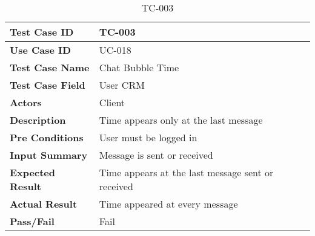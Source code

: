 
\begin{table}[H]
    \centering
    \caption{TC-003}
    \begin{tabular}{ |p{3.8cm}|p{8cm}| }
        \hline
        \textbf{Test Case ID}    & TC-003                                            \\
        \hline
        \textbf{Use Case ID}     & UC-018                                            \\
        \hline
        \textbf{Test Case Name}  & Chat Bubble Time                                  \\
        \hline
        \textbf{Test Case Field} & User CRM                                          \\
        \hline
        \textbf{Actors}          & Client                                            \\
        \hline
        \textbf{Description}     & Time appears only at the last message             \\
        \hline
        \textbf{Pre Conditions}  & User must be logged in                            \\
        \hline
        \textbf{Input Summary}   & Message is sent or received                       \\
        \hline
        \textbf{Expected Result} & Time appears at the last message sent or received \\
        \hline
        \textbf{Actual Result}   & Time appeared at every message                    \\
        \hline
        \textbf{Pass/Fail}       & Fail                                              \\
        \hline
    \end{tabular}
\end{table}